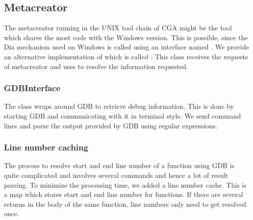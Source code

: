 % 
% 
% 




\subsection{Metacreator} The metacreator running in the UNIX tool chain of CGA might be the tool which shares the most code with the Windows version. This is possible, since the Dia mechanism used on Windows is called using an interface named . We provide an alternative implementation of  which is called . This class receives the requests of metacreator and uses  to resolve the information requested.

\subsubsection{GDBInterface} The  class wraps around GDB to retrieve debug information. This is done by starting GDB and communicating with it in terminal style. We send command lines and parse the output provided by GDB using regular expressions. 

\subsubsection{Line number caching} The process to resolve start and end line number of a function using GDB is quite complicated and involves several commands and hence a lot of result parsing. To minimize the processing time, we added a line number cache. This is a map which stores start and end line number for functions. If there are several returns in the body of the same function, line numbers only need to get resolved once.
